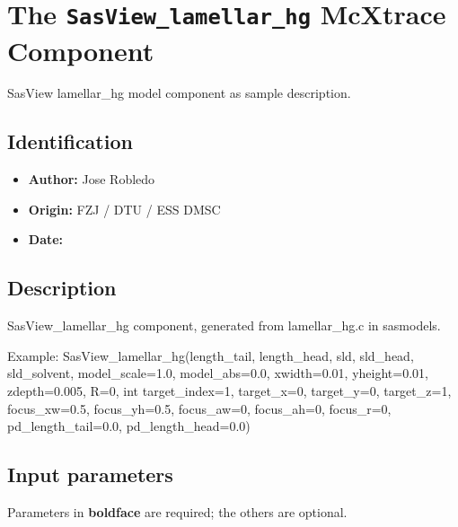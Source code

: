 \section{The \texttt{SasView\_lamellar\_hg} McXtrace Component}
SasView lamellar\_hg model component as sample description.

\subsection*{Identification}
\begin{itemize}
  \item \textbf{Author:} Jose Robledo
  \item \textbf{Origin:} FZJ / DTU / ESS DMSC
  \item \textbf{Date:} 
\end{itemize}

\subsection*{Description}
SasView\_lamellar\_hg component, generated from lamellar\_hg.c in sasmodels.

Example: SasView\_lamellar\_hg(length\_tail, length\_head, sld, sld\_head, sld\_solvent, model\_scale=1.0, model\_abs=0.0, xwidth=0.01, yheight=0.01, zdepth=0.005, R=0, int target\_index=1, target\_x=0, target\_y=0, target\_z=1, focus\_xw=0.5, focus\_yh=0.5, focus\_aw=0, focus\_ah=0, focus\_r=0, pd\_length\_tail=0.0, pd\_length\_head=0.0)

\subsection*{Input parameters}
Parameters in \textbf{boldface} are required; the others are optional.

